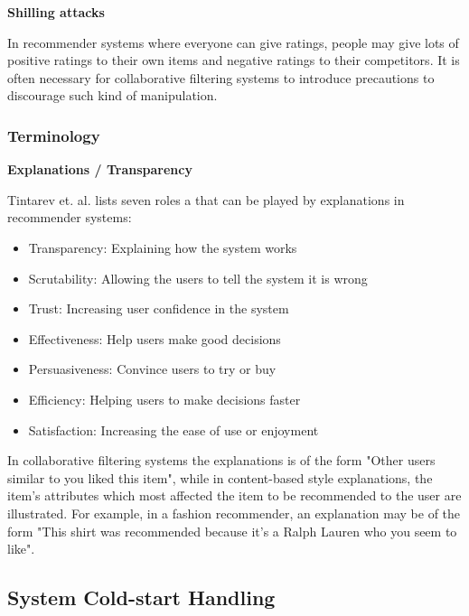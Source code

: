 \textbf{Shilling attacks}

In recommender systems where everyone can give ratings, people may give lots of positive ratings to their own items and negative ratings to their competitors. It is often necessary for collaborative filtering systems to introduce precautions to discourage such kind of manipulation. \linebreak[4]

\subsubsection{Terminology}

\textbf{Explanations / Transparency}

Tintarev et. al. \cite{Tintarev2007} lists seven roles a that can be played by explanations in recommender systems:

\begin{itemize}
\item Transparency: Explaining how the system works
\item Scrutability: Allowing the users to tell the system it is wrong
\item Trust: Increasing user confidence in the system
\item Effectiveness: Help users make good decisions
\item Persuasiveness: Convince users to try or buy
\item Efficiency: Helping users to make decisions faster
\item Satisfaction: Increasing the ease of use or enjoyment
\end{itemize}

In collaborative filtering systems the explanations is of the form "Other users similar to you liked this item", while in content-based style explanations, the item's attributes which most affected the item to be recommended to the user are illustrated. For example, in a fashion recommender, an explanation may be of the form "This shirt was recommended because it's a Ralph Lauren who you seem to like".

\subsection{System Cold-start Handling}


